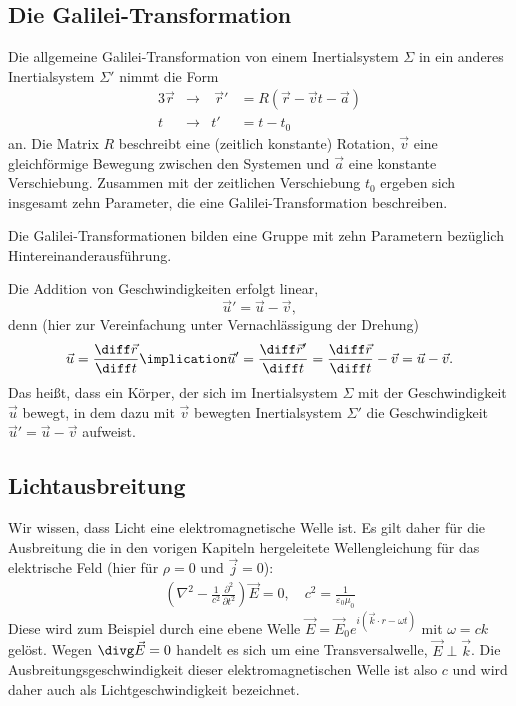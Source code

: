\subsection{Die Galilei-Transformation}

Die allgemeine Galilei-Transformation von einem Inertialsystem $\Sigma$ in ein anderes Inertialsystem $\Sigma'$ nimmt die Form
\begin{alignat*}{3}
    \vec r & \rightarrow & \:\vec r' & = R(\vec r-\vec vt-\vec a) \\
    t      & \rightarrow & t'        & = t-t_0
\end{alignat*}
an. Die Matrix $R$ beschreibt eine (zeitlich konstante) Rotation, $\vec v$ eine gleichförmige Bewegung zwischen den Systemen und $\vec a$ eine konstante Verschiebung. Zusammen mit der zeitlichen Verschiebung $t_0$ ergeben sich insgesamt zehn Parameter, die eine Galilei-Transformation beschreiben.

\begin{formal}
    Die Galilei-Transformationen bilden eine Gruppe mit zehn Parametern bezüglich Hintereinanderausführung.
\end{formal}


Die Addition von Geschwindigkeiten erfolgt linear,
\begin{equation*}
    \vec u' = \vec u - \vec v,
\end{equation*}
denn (hier zur Vereinfachung unter Vernachlässigung der Drehung)
\begin{align*}
    \vec u = \frac{\diff\vec r}{\diff t} \implication \vec u' = \frac{\diff\vec r'}{\diff t} = \frac{\diff\vec r}{\diff t}-\vec v= \vec u - \vec v.
\end{align*}
Das heißt, dass ein Körper, der sich im Inertialsystem $\Sigma$ mit der Geschwindigkeit $\vec u$ bewegt, in dem dazu mit $\vec v$ bewegten Inertialsystem $\Sigma'$ die Geschwindigkeit $\vec u'=\vec u-\vec v$ aufweist.


\subsection{Lichtausbreitung}

Wir wissen, dass Licht eine elektromagnetische Welle ist. Es gilt daher für die Ausbreitung die in den vorigen Kapiteln hergeleitete Wellengleichung für das elektrische Feld (hier für $\rho=0$ und $\vec j=0$):
\begin{align}
    \label{eq:wellengleichung_e}
    \left(\nabla^2-\frac{1}{c^2}\frac{\partial^2}{\partial t^2}\right) \vec E=0, \quad c^2=\frac{1}{\varepsilon_0\mu_0}
\end{align}
Diese wird zum Beispiel durch eine ebene Welle $\vec E=\vec E_0 e^{i(\vec k\cdot r-\omega t)}$ mit $\omega=ck$ gelöst. Wegen $\divg \vec E =0$ handelt es sich um eine Transversalwelle, $\vec E\perp \vec k$. Die Ausbreitungsgeschwindigkeit dieser elektromagnetischen Welle ist also $c$ und wird daher auch als Lichtgeschwindigkeit bezeichnet.

